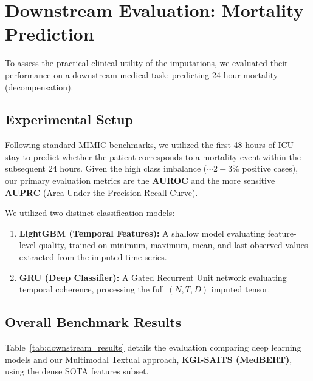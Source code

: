 \section{Downstream Evaluation: Mortality Prediction}
\label{sec:downstream_evaluation}

To assess the practical clinical utility of the imputations, we evaluated their performance on a downstream medical task: predicting 24-hour mortality (decompensation). 

\subsection{Experimental Setup}
Following standard MIMIC benchmarks, we utilized the first 48 hours of ICU stay to predict whether the patient corresponds to a mortality event within the subsequent 24 hours. Given the high class imbalance ($\sim 2-3\%$ positive cases), our primary evaluation metrics are the \textbf{AUROC} and the more sensitive \textbf{AUPRC} (Area Under the Precision-Recall Curve).

We utilized two distinct classification models:
\begin{enumerate}
    \item \textbf{LightGBM (Temporal Features):} A shallow model evaluating feature-level quality, trained on minimum, maximum, mean, and last-observed values extracted from the imputed time-series.
    \item \textbf{GRU (Deep Classifier):} A Gated Recurrent Unit network evaluating temporal coherence, processing the full $(N, T, D)$ imputed tensor.  
\end{enumerate}

\subsection{Overall Benchmark Results}
Table~\ref{tab:downstream_results} details the evaluation comparing deep learning models and our Multimodal Textual approach, \textbf{KGI-SAITS (MedBERT)}, using the dense SOTA features subset.

